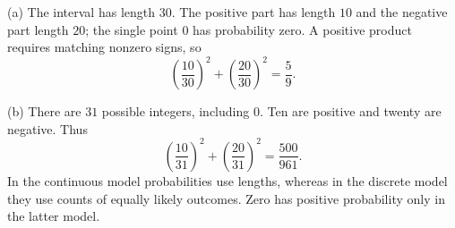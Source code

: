 (a) The interval has length $30$. The positive part has length $10$ and the negative part length $20$; the single point $0$ has probability zero. A positive product requires matching nonzero signs, so
\[
\boxed{\left(\dfrac{10}{30}\right)^2+\left(\dfrac{20}{30}\right)^2=\dfrac{5}{9}}.
\]

(b) There are $31$ possible integers, including $0$. Ten are positive and twenty are negative. Thus
\[
\boxed{\left(\dfrac{10}{31}\right)^2+\left(\dfrac{20}{31}\right)^2=\dfrac{500}{961}}.
\]
In the continuous model probabilities use lengths, whereas in the discrete model they use counts of equally likely outcomes. Zero has positive probability only in the latter model.
